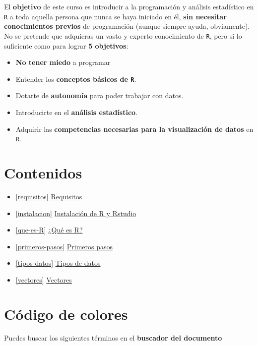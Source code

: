 \documentclass[11pt,]{book}
\providecommand{\tightlist}{%
  \setlength{\itemsep}{0pt}\setlength{\parskip}{0pt}}
\begin{document}
El \textbf{objetivo} de este curso es introducir a la programación y análisis estadístico en \texttt{R} a toda aquella persona que nunca se haya iniciado en él, \textbf{sin necesitar conocimientos previos} de programación (aunque siempre ayuda, obviamente). No se pretende que adquieras un vasto y experto conocimiento de \texttt{R}, pero si lo suficiente como para lograr \textbf{5 objetivos}:

\begin{itemize}
\tightlist
\item
  \textbf{No tener miedo} a programar
\item
  Entender los \textbf{conceptos básicos de \texttt{R}}.
\item
  Dotarte de \textbf{autonomía} para poder trabajar con datos.
\item
  Introducirte en el \textbf{análisis estadístico}.
\item
  Adquirir las \textbf{competencias necesarias para la visualización de datos} en \texttt{R}.
\end{itemize}

\hypertarget{contenidos}{%
\section*{Contenidos}\label{contenidos}}


\begin{itemize}
\item
  \ref{requisitos} \protect\hyperlink{requisitos}{Requisitos}
\item
  \ref{instalacion} \protect\hyperlink{instalacion}{Instalación de R y Rstudio}
\item
  \ref{que-es-R} \protect\hyperlink{que-es-R}{¿Qué es R?}
\item
  \ref{primeros-pasos} \protect\hyperlink{primeros-pasos}{Primeros pasos}
\item
  \ref{tipos-datos} \protect\hyperlink{tipos-datos}{Tipos de datos}
\item
  \ref{vectores} \protect\hyperlink{vectores}{Vectores}
\end{itemize}

\hypertarget{cuxf3digo-de-colores}{%
\section*{Código de colores}\label{cuxf3digo-de-colores}}


Puedes buscar los siguientes términos en el \textbf{buscador del documento}
\end{document}
